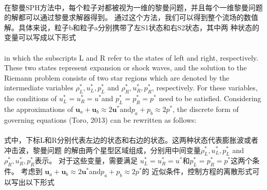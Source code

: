 \documentclass[UTF8]{ctexart}
\begin{document}
\paragraph{\quad}在黎曼SPH方法中，每个粒子对都被视为一维的黎曼问题，并且每个一维黎曼问题的解都可以通过黎曼求解器得到。
                通过这个方法，我们可以得到整个流场的数值解。具体来说，粒子b和粒子a分别携带了左S1状态和右S2状态，其中两
                种状态的变量可以写成以下形式


\paragraph{\quad}in which the subscripts L and R refer to the states of left and right, 
                respectively. These two states represent expansion or shock waves, and 
                the solution to the Riemann problem consists of two star regions which 
                are denoted by the intermediate variables $\rho^*_L, u^*_L, p^*_L$ and $\rho^*_R, u^*_R, p^*_R$, 
                respectively. For these variables, the conditions of $u^*_L = u^*_R = u^* $and $p^*_L = p^*_R = p^* $
                need to be satisfied. Considering the approximations of $\mathbf{u}_a + \mathbf{u}_b \approx 2\mathbf{u}^* $and$p_a + p_b \approx 2p^*$, 
                the discrete form of governing equations (Toro, 2013) can be rewritten as follows:
\paragraph{\quad}式中，下标L和R分别代表左边的状态和右边的状态。这两种状态代表膨胀波或者冲击波，黎曼问题
                的解由两个星型区域组成，分别用中间变量$\rho^*_L, u^*_L, p^*_L$ and $\rho^*_R, u^*_R, p^*_R$表示。
                对于这些变量，需要满足 $u^*_L = u^*_R = u^* $和$p^*_L = p^*_R = p^* $这两个条件。
                考虑到 $\mathbf{u}_a + \mathbf{u}_b \approx 2\mathbf{u}^* $and$p_a + p_b \approx 2p^*$的
                近似条件，控制方程的离散形式可以写出以下形式

\end{document}
